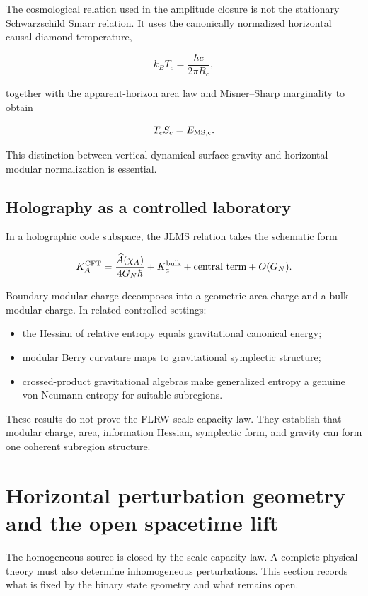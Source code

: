 \documentclass[
  11pt,
  letterpaper,
]{article}
\providecommand{\tightlist}{%
  \setlength{\itemsep}{0pt}\setlength{\parskip}{0pt}}
\begin{document}
The cosmological relation used in the amplitude closure is not the
stationary Schwarzschild Smarr relation. It uses the canonically
normalized horizontal causal-diamond temperature,

\[
k_BT_c=\frac{\hbar c}{2\pi R_c},
\]

together with the apparent-horizon area law and Misner--Sharp
marginality to obtain

\[
T_cS_c=E_{\rm MS,c}.
\]

This distinction between vertical dynamical surface gravity and
horizontal modular normalization is essential.

\subsection{Holography as a controlled
laboratory}\label{holography-as-a-controlled-laboratory}

In a holographic code subspace, the JLMS relation takes the schematic
form

\[
K_A^{\rm CFT}
=\frac{\widehat A(\chi_A)}{4G_N\hbar}
+K_a^{\rm bulk}
+\text{central term}
+O(G_N).
\]

Boundary modular charge decomposes into a geometric area charge and a
bulk modular charge. In related controlled settings:

\begin{itemize}
\tightlist
\item
  the Hessian of relative entropy equals gravitational canonical energy;
\item
  modular Berry curvature maps to gravitational symplectic structure;
\item
  crossed-product gravitational algebras make generalized entropy a
  genuine von Neumann entropy for suitable subregions.
\end{itemize}

These results do not prove the FLRW scale-capacity law. They establish
that modular charge, area, information Hessian, symplectic form, and
gravity can form one coherent subregion structure.

\section{Horizontal perturbation geometry and the open spacetime
lift}\label{horizontal-perturbation-geometry-and-the-open-spacetime-lift}

The homogeneous source is closed by the scale-capacity law. A complete
physical theory must also determine inhomogeneous perturbations. This
section records what is fixed by the binary state geometry and what
remains open.
\end{document}
